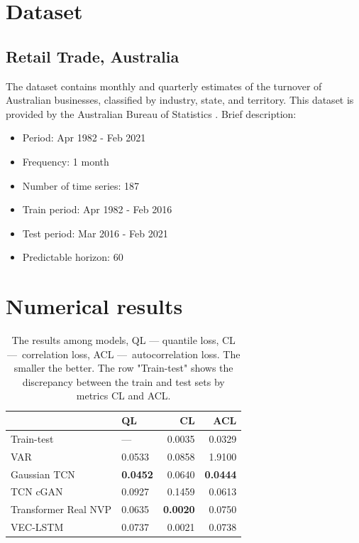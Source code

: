\documentclass[12pt,a4paper]{article}
\begin{document}
\section{Dataset}

\subsection{Retail Trade, Australia}
The dataset contains monthly and quarterly estimates of the turnover of Australian businesses, classified by industry, state, and territory. This dataset is provided by the Australian Bureau of Statistics \cite{australia2021}. Brief description:
\begin{itemize}
    \item Period: Apr 1982 - Feb 2021
    \item Frequency: 1 month
    \item Number of time series: 187
    \item Train period: Apr 1982 - Feb 2016
    \item Test period: Mar 2016 - Feb 2021
    \item Predictable horizon: 60 
\end{itemize}

\section{Numerical results}

\begin{table}
\centering
\begin{tabular}{llrr}
\toprule
{} &      QL &      CL &     ACL \\
\midrule
Train-test          &       — &  0.0035 &  0.0329 \\
VAR                 &  0.0533 &  0.0858 &  1.9100 \\
Gaussian TCN        &  \textbf{0.0452} &  0.0640 &  \textbf{0.0444} \\
TCN cGAN            &  0.0927 &  0.1459 &  0.0613 \\
Transformer Real NVP &  0.0635 &  \textbf{0.0020} &  0.0750 \\
VEC-LSTM            &  0.0737 &  0.0021 &  0.0738 \\
\bottomrule
\end{tabular}
\caption{The results among models, QL — quantile loss, CL — correlation loss, ACL — autocorrelation loss. The smaller the better. The row "Train-test" shows the discrepancy between the train and test sets by metrics CL and ACL.}
\label{table:1}
\end{table}
\end{document}
